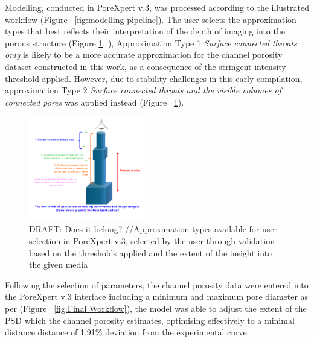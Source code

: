 \documentclass[3p,twocolumn]{elsarticle}
\begin{document}
    Modelling, conducted in PoreXpert v.3, was processed according to the
    illustrated workflow (Figure ~\ref{fig:modelling pipeline}). The user
    selects the approximation types that best reflects their interpretation of
    the depth of imaging into the porous structure (Figure
    \ref{fig:pxapproxtypes}, \citep{MatthewsPoreXpert2025}), Approximation Type
    1 \textit{Surface connected throats only} is likely to be a more accurate
    approximation for the channel porosity dataset constructed in this work, as
    a consequence of the stringent intensity threshold applied. However, due to
    stability challenges in this early compilation, approximation Type 2
    \textit{Surface connected throats and the visible volumes of connected
    pores} was applied instead (Figure ~\ref{fig:pxapproxtypes}).
    

    \begin{figure}
	    \centering
	    \includegraphics[width=0.45\textwidth]{./Media/PX Approximation Types.png}
	    \caption{DRAFT: Does it belong? //Approximation types available for user selection in PoreXpert v.3, selected by the user through validation based on the thresholds applied and the extent of the insight into the given media }
	    \label{fig:pxapproxtypes}
	\end{figure}

  Following the selection of parameters, the channel porosity data were entered
  into the PoreXpert v.3 interface including a minimum and maximum pore diameter
  as per (Figure ~\ref{fig:Final Workflow}),  the model was able to adjust the
  extent of the PSD which the channel porosity estimates, optimising effectively
  to a minimal distance distance of 1.91\% deviation from the experimental curve
\end{document}
